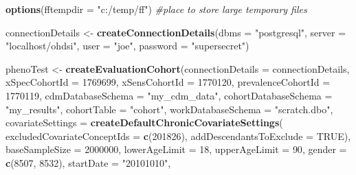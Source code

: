 \documentclass[
]{article}
\newenvironment{Shaded}{\begin{snugshade}}{\end{snugshade}}
\newcommand{\CommentTok}[1]{\textcolor[rgb]{0.56,0.35,0.01}{\textit{#1}}}
\newcommand{\DataTypeTok}[1]{\textcolor[rgb]{0.13,0.29,0.53}{#1}}
\newcommand{\DecValTok}[1]{\textcolor[rgb]{0.00,0.00,0.81}{#1}}
\newcommand{\KeywordTok}[1]{\textcolor[rgb]{0.13,0.29,0.53}{\textbf{#1}}}
\newcommand{\NormalTok}[1]{#1}
\newcommand{\OtherTok}[1]{\textcolor[rgb]{0.56,0.35,0.01}{#1}}
\newcommand{\StringTok}[1]{\textcolor[rgb]{0.31,0.60,0.02}{#1}}
\begin{document}
\begin{Shaded}
\begin{Highlighting}[]
\KeywordTok{options}\NormalTok{(}\DataTypeTok{fftempdir =} \StringTok{"c:/temp/ff"}\NormalTok{) }\CommentTok{#place to store large temporary files}

\NormalTok{connectionDetails <-}\StringTok{ }\KeywordTok{createConnectionDetails}\NormalTok{(}\DataTypeTok{dbms =} \StringTok{"postgresql"}\NormalTok{,}
                                              \DataTypeTok{server =} \StringTok{"localhost/ohdsi"}\NormalTok{,}
                                              \DataTypeTok{user =} \StringTok{"joe"}\NormalTok{,}
                                              \DataTypeTok{password =} \StringTok{"supersecret"}\NormalTok{)}

\NormalTok{phenoTest <-}\StringTok{ }\KeywordTok{createEvaluationCohort}\NormalTok{(}\DataTypeTok{connectionDetails =}\NormalTok{ connectionDetails,}
                                   \DataTypeTok{xSpecCohortId =} \DecValTok{1769699}\NormalTok{,}
                                   \DataTypeTok{xSensCohortId =} \DecValTok{1770120}\NormalTok{,}
                                   \DataTypeTok{prevalenceCohortId =} \DecValTok{1770119}\NormalTok{,}
                                   \DataTypeTok{cdmDatabaseSchema =} \StringTok{"my_cdm_data"}\NormalTok{,}
                                   \DataTypeTok{cohortDatabaseSchema =} \StringTok{"my_results"}\NormalTok{,}
                                   \DataTypeTok{cohortTable  =} \StringTok{"cohort"}\NormalTok{,}
                                   \DataTypeTok{workDatabaseSchema =} \StringTok{"scratch.dbo"}\NormalTok{,}
                                   \DataTypeTok{covariateSettings =} 
                                    \KeywordTok{createDefaultChronicCovariateSettings}\NormalTok{(}
                                     \DataTypeTok{excludedCovariateConceptIds =} \KeywordTok{c}\NormalTok{(}\DecValTok{201826}\NormalTok{),}
                                     \DataTypeTok{addDescendantsToExclude =} \OtherTok{TRUE}\NormalTok{),}
                                   \DataTypeTok{baseSampleSize =} \DecValTok{2000000}\NormalTok{,}
                                   \DataTypeTok{lowerAgeLimit =} \DecValTok{18}\NormalTok{,}
                                   \DataTypeTok{upperAgeLimit =} \DecValTok{90}\NormalTok{,}
                                   \DataTypeTok{gender =} \KeywordTok{c}\NormalTok{(}\DecValTok{8507}\NormalTok{, }\DecValTok{8532}\NormalTok{),}
                                   \DataTypeTok{startDate =} \StringTok{"20101010"}\NormalTok{,}

\end{Highlighting}
\end{Shaded}
\end{document}
